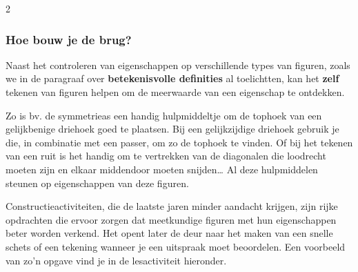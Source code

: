 

\begin{multicols}{2}
    

\subsubsection*{Hoe bouw je de brug?}

Naast het controleren van eigenschappen op verschillende types van figuren, zoals we in de paragraaf over \textbf{betekenisvolle definities} al toelichtten, kan het \textbf{zelf} tekenen van figuren helpen om de meerwaarde van een eigenschap te ontdekken.

Zo is bv. de symmetrieas een handig hulpmiddeltje om de tophoek van een gelijkbenige driehoek goed te plaatsen.
Bij een gelijkzijdige driehoek gebruik je die, in combinatie met een passer, om zo de tophoek te vinden.
Of bij het tekenen van een ruit is het handig om te vertrekken van de diagonalen die loodrecht moeten zijn en elkaar middendoor moeten snijden\ldots{}
Al deze hulpmiddelen steunen op eigenschappen van deze figuren.

Constructieactiviteiten, die de laatste jaren minder aandacht krijgen, zijn rijke opdrachten die ervoor zorgen dat meetkundige figuren met hun eigenschappen beter worden verkend.
Het opent later de deur naar het maken van een snelle schets of een tekening wanneer je een uitspraak moet beoordelen.
Een voorbeeld van zo'n opgave vind je in de lesactiviteit hieronder.
\end{multicols}

